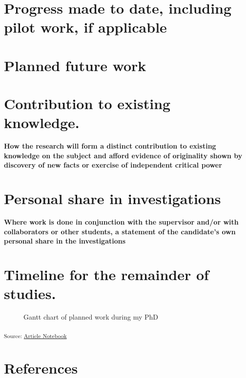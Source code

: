 \documentclass[
  letterpaper,
  DIV=11,
  numbers=noendperiod]{scrartcl}
\begin{document}
\section{Progress made to date, including pilot work, if
applicable}\label{progress-made-to-date-including-pilot-work-if-applicable}

\section{Planned future work}\label{planned-future-work}

\section{Contribution to existing
knowledge.}\label{contribution-to-existing-knowledge.}

\textbf{How the research will form a distinct contribution to existing
knowledge on the subject and afford evidence of originality shown by
discovery of new facts or exercise of independent critical power}

\section{Personal share in
investigations}\label{personal-share-in-investigations}

\textbf{Where work is done in conjunction with the supervisor and/or
with collaborators or other students, a statement of the candidate's own
personal share in the investigations}

\section{Timeline for the remainder of
studies.}\label{timeline-for-the-remainder-of-studies.}

\label{cell-fig-gantt-chart}
\begin{figure}[H]


\caption{\label{fig-gantt-chart}Gantt chart of planned work during my
PhD}

\end{figure}%

\textsubscript{Source:
\href{https://juliam98.github.io/phd-upgrade-proposal/index.qmd.html}{Article
Notebook}}

\newpage{}

\section{References}\label{references}

\printbibliography[heading=none]
\end{document}
